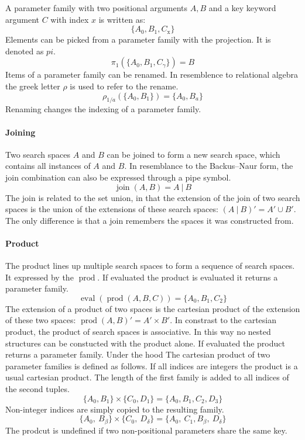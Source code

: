 \documentclass[english]{article}
\newcommand{\eval}{\operatorname{eval}}
\newcommand{\prot}{\operatorname{prod}}
\begin{document}
A parameter family with two positional arguments $A,B$ and a key keyword argument $C$ with index $x$ is written as:
$$\{A_0, B_1, C_{\text{x}}\}$$
Elements can be picked from a parameter family with the projection. It is denoted as $pi$.
$$\pi_1(\{A_0, B_1, C_\gamma\}) = B$$
Items of a parameter family can be renamed. In resemblence to relational algebra the greek letter $\rho$ is used to refer to the rename.
$$\rho_{1/a}(\{A_{0}, B_{1}\}) = \{A_{0}, B_{a}\}$$
Renaming changes the indexing of a parameter family.

\paragraph{Joining}
Two search spaces $A$ and $B$ can be joined to form a new search space, which contains all instances of $A$ and $B$. In resemblance to the Backus–Naur form, the join combination can also be expressed through a pipe symbol.
$$ \operatorname{join}(A, B) = A\ |\ B $$
The join is related to the set union, in that the extension of the join of two search spaces is the union of the extensions of these search spaces: $(A\ |\ B)' = A' \cup B'$. The only difference is that a join remembers the spaces it was constructed from.

\paragraph{Product}
The product lines up multiple search spaces to form a sequence of search spaces. It expressed by the $\prot$. If evaluated the product is evaluated it returns a parameter family.
$$\eval(\prot(A, B, C)) = \{A_0, B_1, C_2\}$$
The extension of a product of two spaces is the cartesian product of the extension of these two spaces: $\prot(A,B)' = A' \times B'$. In constrast to the cartesian product, the product of search spaces is associative.  In this way no nested structures can be constucted with the product alone. If evaluated the product returns a parameter family. Under the hood
The cartesian product of two parameter families is defined as follows. If all indices are integers the product is a usual cartesian product. The length of the first family is added to all indices of the second tuples.
$$\{A_0, B_1\} \times \{C_0, D_1\} = \{A_0, B_1, C_2, D_3\}$$
Non-integer indices are simply copied to the resulting family.
$$\{A_0,\ B_\beta\} \times \{C_0,\ D_\delta\} = \{A_0,\ C_1, B_\beta,\ D_\delta\}$$
The prodcut is undefined if two non-positional parameters share the same key.
\end{document}
